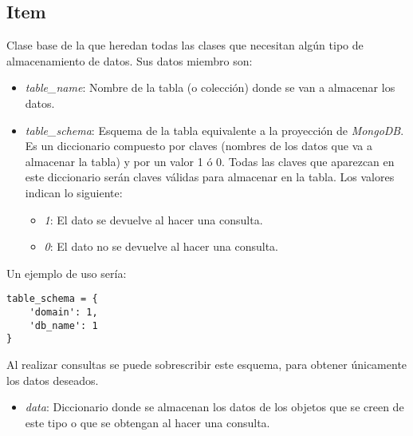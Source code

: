 \subsection{Item}

Clase base de la que heredan todas las clases que necesitan algún tipo de almacenamiento de datos. Sus datos miembro son:
\begin{itemize}
	\item \textit{table\_name}: Nombre de la tabla (o colección) donde se van a almacenar los datos.
	\item \textit{table\_schema}: Esquema de la tabla equivalente a la proyección de \textit{MongoDB}. Es un diccionario compuesto por claves (nombres de los datos que va a almacenar la tabla) y por un valor 1 ó 0. Todas las claves que aparezcan en este diccionario serán claves válidas para almacenar en la tabla. Los valores indican lo siguiente:
	\begin{itemize}
		\item \textit{1}: El dato se devuelve al hacer una consulta.
		\item \textit{0}: El dato no se devuelve al hacer una consulta.
	\end{itemize}
\end{itemize}

\bigskip
Un ejemplo de uso sería:

\begin{lstlisting}
table_schema = {
	'domain': 1,
	'db_name': 1
}
\end{lstlisting}

\bigskip
Al realizar consultas se puede sobrescribir este esquema, para obtener únicamente los datos deseados.
\begin{itemize}
	\item \textit{data}: Diccionario donde se almacenan los datos de los objetos que se creen de este tipo o que se obtengan al hacer una consulta.
\end{itemize}


